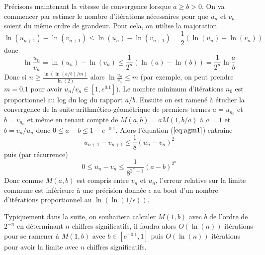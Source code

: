 \documentclass[a4paper,11pt]{article}
\begin{document}
\begin{giacjshere}
Précisons maintenant la vitesse de convergence lorsque $a \geq b>0$. 
On va commencer par estimer le nombre
d'itérations nécessaires pour que $u_n$ et $v_n$ soient du même ordre de grandeur.
Pour cela, on utilise la majoration
\[ \ln(u_{n+1})-\ln(v_{n+1}) \leq \ln(u_{n})-\ln(v_{n+1}) = \frac{1}{2}
(\ln(u_{n})-\ln(v_{n})) \]
donc
\[ \ln \frac{u_n}{v_n} = \ln(u_n)-\ln(v_n) \leq 
\frac{1}{2^n} (\ln(a)-\ln(b)) = \frac{1}{2^n} \ln \frac{a}{b} \]
Donc si $n \geq \frac{\ln( \ln(a/b)/m)}{\ln(2)}$ alors
$\ln \frac{u_n}{v_n} \leq m$ (par exemple, on peut prendre $m=0.1$ pour 
avoir $u_n/v_n \in [1,e^{0.1}])$. Le nombre minimum d'itérations $n_0$ est proportionnel
au log du log du rapport $a/b$.
Ensuite on est ramené à étudier la convergence de la suite arithmético-géométrique
de premiers termes $a=u_{n_0}$ et $b=v_{n_0}$ et même en tenant compte
de $M(a,b)=aM(1,b/a)$ à $a=1$ et $b=v_n/u_n$ donc $0\leq a-b \leq 1-e^{-0.1}$.
Alors l'équation (\(\ref{eq:agm1}\)) entraine 
\[ u_{n+1}-v_{n+1} \leq \frac{1}{8}(u_n-v_n)^2 \]
puis (par récurrence)
\[ 0 \leq u_n-v_n \leq \frac{1}{8^{2^n-1}}(a-b)^{2^n} \]
Donc comme $M(a,b)$ est compris entre $v_n$ et $u_n$, l'erreur relative sur la limite
commune est inférieure à une précision donnée $\epsilon$
au bout d'un nombre d'itérations proportionnel au $\ln(\ln(1/\epsilon))$.

Typiquement dans la suite, on souhaitera calculer $M(1,b)$ avec $b$ de l'ordre
de $2^{-n}$ en déterminant $n$ chiffres significatifs,
il faudra alors $O(\ln(n))$ itérations pour se ramener à $M(1,b)$ avec $b\in [e^{-0.1},1]$ 
puis $O(\ln(n))$ itérations pour avoir la limite avec $n$ chiffres significatifs.


\end{giacjshere}
\end{document}
